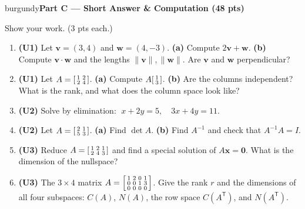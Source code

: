 \documentclass[10pt]{article}
\newcommand{\vv}{\mathbf{v}}
\newcommand{\ww}{\mathbf{w}}
\newcommand{\xx}{\mathbf{x}}
\newcommand{\zero}{\mathbf{0}}
\newcommand{\T}{\mathsf{T}}
\newcommand{\parthead}[1]{%
  \vspace{6pt}\noindent
  \begin{headlinebox}{burgundy}{\color{white}\bfseries #1}\end{headlinebox}%
  \vspace{4pt}}
\begin{document}
\parthead{Part C --- Short Answer \& Computation (48 pts)}
Show your work. ($3$ pts each.)

\begin{enumerate}[leftmargin=1.9em, itemsep=10pt]
  \item \textbf{(U1)} Let $\vv=(3,4)$ and $\ww=(4,-3)$.
        \textbf{(a)} Compute $2\vv+\ww$. \textbf{(b)} Compute $\vv\cdot\ww$ and the lengths $\|\vv\|,\|\ww\|$.
        Are $\vv$ and $\ww$ perpendicular?
        \vspace{2.2cm}
  \item \textbf{(U1)} Let $A=\begin{bsmallmatrix}1&2\\2&4\end{bsmallmatrix}$.
        \textbf{(a)} Compute $A\begin{bsmallmatrix}1\\3\end{bsmallmatrix}$.
        \textbf{(b)} Are the columns independent? What is the rank, and what does the column space look like?
        \vspace{2.2cm}
  \item \textbf{(U2)} Solve by elimination: $\;x+2y=5,\quad 3x+4y=11.$
        \vspace{2.2cm}
  \item \textbf{(U2)} Let $A=\begin{bsmallmatrix}2&1\\5&3\end{bsmallmatrix}$.
        \textbf{(a)} Find $\det A$. \textbf{(b)} Find $A^{-1}$ and check that $A^{-1}A=I$.
        \vspace{2.4cm}
  \item \textbf{(U3)} Reduce $A=\begin{bsmallmatrix}1&2&1\\2&4&3\end{bsmallmatrix}$ and find a special solution of $A\xx=\zero$.
        What is the dimension of the nullspace?
        \vspace{2.4cm}
  \item \textbf{(U3)} The $3\times4$ matrix $A=\begin{bsmallmatrix}1&2&0&1\\0&0&1&3\\0&0&0&0\end{bsmallmatrix}$.
        Give the rank $r$ and the dimensions of all four subspaces: $C(A)$, $N(A)$, the row space $C(A^\T)$, and $N(A^\T)$.

\end{enumerate}
\end{document}
